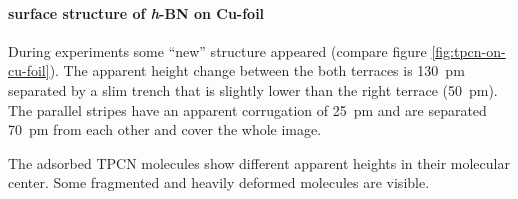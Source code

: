 \paragraph{surface structure of \textit{h}-BN on Cu-foil}
During experiments some ``new'' structure appeared (compare figure \ref{fig:tpcn-on-cu-foil}).
The apparent height change between the both terraces is \SI{130}{\pico \meter} separated by a slim trench that is slightly lower than the right terrace (\SI{50}{\pico \meter}). The parallel stripes have an apparent corrugation of \SI{25}{\pico \meter} and are separated \SI{70}{\pico \meter} from each other and cover the whole image. 

The adsorbed TPCN molecules show different apparent heights in their molecular center. Some fragmented and heavily deformed molecules are visible.

